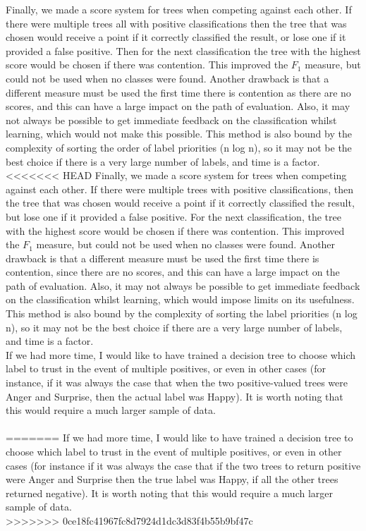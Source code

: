 \documentclass[12pt]{article}
\begin{document}
Finally, we made a score system for trees when competing against each other. If there were multiple trees all with positive classifications then the tree that was chosen would receive a point if it correctly classified the result, or lose one if it provided a false positive. Then for the next classification the tree with the highest score would be chosen if there was contention. This improved the \( F_1 \) measure, but could not be used when no classes were found. Another drawback is that a different measure must be used the first time there is contention as there are no scores, and this can have a large impact on the path of evaluation. Also, it may not always be possible to get immediate feedback on the classification whilst learning, which would not make this possible. This method is also bound by the complexity of sorting the order of label priorities (n log n), so it may not be the best choice if there is a very large number of labels, and time is a factor. \\

<<<<<<< HEAD
Finally, we made a score system for trees when competing against each other. If there were multiple trees with positive classifications, then the tree that was chosen would receive a point if it correctly classified the result, but lose one if it provided a false positive. For the next classification, the tree with the highest score would be chosen if there was contention. This improved the \( F_1 \) measure, but could not be used when no classes were found. Another drawback is that a different measure must be used the first time there is contention, since there are no scores, and this can have a large impact on the path of evaluation. Also, it may not always be possible to get immediate feedback on the classification whilst learning, which would impose limits on its usefulness. This method is also bound by the complexity of sorting the label priorities (n log n), so it may not be the best choice if there are a very large number of labels, and time is a factor. \\

If we had more time, I would like to have trained a decision tree to choose which label to trust in the event of multiple positives, or even in other cases (for instance, if it was always the case that when the two positive-valued trees were Anger and Surprise, then the actual label was Happy). It is worth noting that this would require a much larger sample of data. \\ \\
=======
If we had more time, I would like to have trained a decision tree to choose which label to trust in the event of multiple positives, or even in other cases (for instance if it was always the case that if the two trees to return positive were Anger and Surprise then the true label was Happy, if all the other trees returned negative). It is worth noting that this would require a much larger sample of data. \\
>>>>>>> 0ce18fc41967fc8d7924d1dc3d83f4b55b9bf47c
\end{document}
